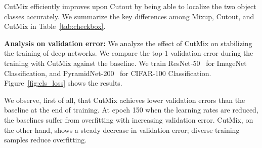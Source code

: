 {CutMix efficiently improves upon Cutout by being able to localize the two object classes accurately. }
We summarize the key differences among Mixup, Cutout, and CutMix in Table~\ref{tab:checkbox}.


\noindent\textbf{Analysis on validation error: }
We analyze the effect of CutMix on stabilizing the training of deep networks.
We compare the top-1 validation error during the training with CutMix against the baseline.
We train ResNet-50~\cite{resnet} for ImageNet Classification, and PyramidNet-200~\cite{pyramidnet} for CIFAR-100 Classification.
Figure~\ref{fig:cls_loss} shows the results.

We observe, first of all, that CutMix achieves lower validation errors than the baseline at the end of training. 
At epoch 150 when the learning rates are reduced, the baselines suffer from overfitting with increasing validation error.
CutMix, on the other hand, shows a steady decrease in validation error; diverse training samples reduce overfitting.